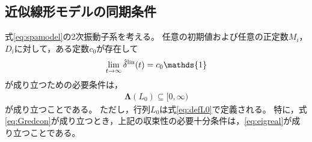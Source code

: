 \documentclass[tombow,dvipdfmx]{corona-a5}
\begin{document}
\subsection{近似線形モデルの同期条件}



\begin{補題}[2次振動子系の同期条件]\label{thm:2ndsys}
式\ref{eq:spamodel}の2次振動子系を考える。
任意の初期値および任意の正定数$M_i$，$D_i$に対して，ある定数$c_0$が存在して
\[
\lim_{t\rightarrow \infty} \hat{\delta}^{\rm lin}(t)= c_0 \mathds{1}
\]
が成り立つための必要条件は，
\begin{align}\label{eq:eigreal}
\bm{\Lambda}(L_0)\subseteq [0,\infty)
\end{align}
が成り立つことである。
ただし，行列$L_0$は式\ref{eq:defL0}で定義される。
特に，式\ref{eq:Gredcon}が成り立つとき，上記の収束性の必要十分条件は，\ref{eq:eigreal}が成り立つことである。
\end{補題}
\end{document}
